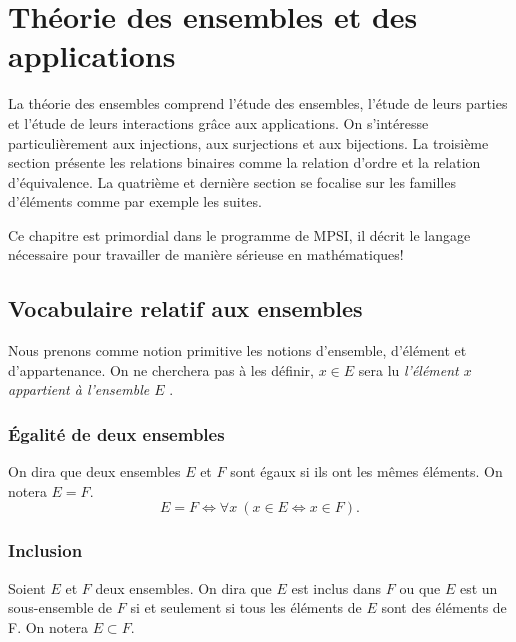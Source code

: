 \chapter{Théorie des ensembles et des applications}\label{chap:ensembles}
\minitoc%
\minilof%
\minilot%

La théorie des ensembles comprend l'étude des ensembles, l'étude de leurs
parties et l'étude de leurs interactions grâce aux applications. On s'intéresse
particulièrement aux injections, aux surjections et aux bijections. La troisième
section présente les relations binaires comme la relation d'ordre et la relation
d'équivalence. La quatrième et dernière section se focalise sur les familles
d'éléments comme par exemple les suites.

Ce chapitre est primordial dans le programme de MPSI, il décrit le langage
nécessaire pour travailler de manière sérieuse en mathématiques!

\section{Vocabulaire relatif aux ensembles}\label{chap3-sec:vocabensemble}

Nous prenons comme notion primitive les notions d'ensemble, d'élément et
d'appartenance. On ne cherchera pas à les définir, \og\(x \in{}E\)\fg{} sera
lu \og\emph{l'élément \(x\) appartient à l'ensemble \(E\)} \fg{}.

\subsection{Égalité de deux ensembles}\label{chap3-subsec:egalitededeuxensembles}

\begin{defdef}
  On dira que deux ensembles \(E\) et \(F\) sont égaux si ils ont les mêmes
  éléments. On notera \(E = F\).
  \begin{equation}
    E=F\iff\forall{}x \ \left(x\in{}E\iff{} x\in{} F\right).
  \end{equation}
\end{defdef}

\subsection{Inclusion}\label{chap3-subsec:inclusion}

\begin{defdef}
  Soient \(E\) et \(F\) deux ensembles. On dira que \(E\) est inclus dans
  \(F\) ou que \(E\) est un sous-ensemble de \(F\) si et seulement si tous les
  éléments de \(E\) sont des éléments de F. On notera \(E \subset{}F\).
\end{defdef}

